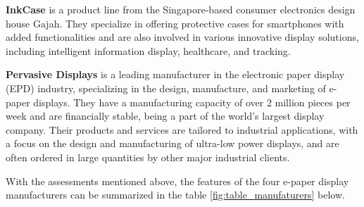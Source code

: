 \documentclass[../Main.tex]{subfiles}
\begin{document}
\textbf{InkCase} is a product line from the Singapore-based consumer electronics design house Gajah. They specialize in offering protective cases for smartphones with added functionalities and are also involved in various innovative display solutions, including intelligent information display, healthcare, and tracking. 

\textbf{Pervasive Displays} is a leading manufacturer in the electronic paper display (EPD) industry, specializing in the design, manufacture, and marketing of e-paper displays. They have a manufacturing capacity of over 2 million pieces per week and are financially stable, being a part of the world's largest display company. Their products and services are tailored to industrial applications, with a focus on the design and manufacturing of ultra-low power displays, and are often ordered in large quantities by other major industrial clients.

With the assessments mentioned above, the features of the four e-paper display manufacturers can be summarized in the table \ref{fig:table_manufaturers} below.
\end{document}
